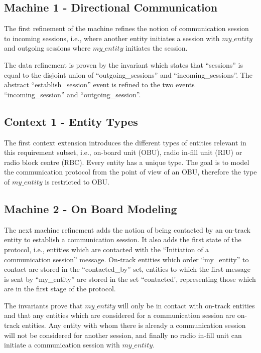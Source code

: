 \documentclass[10pt,a4paper]{article}
\begin{document}
\subsection{Machine 1 - Directional Communication}
\label{sec:mach-1-direct}

The first refinement of the machine refines the notion of communication session
to incoming sessions, i.e., where another entity initiates a session with
$my\_entity$ and outgoing sessions where $my\_entity$ initiates the session.

The data refinement is proven by the invariant which states that ``sessions'' is
equal to the disjoint union of ``outgoing\_sessions'' and
``incoming\_sessions''. The abstract ``establish\_session'' event is refined to
the two events ``incoming\_session'' and ``outgoing\_session''.



\subsection{Context 1 - Entity Types}
\label{sec:context-1-entity}

The first context extension introduces the different types of entities relevant
in this requirement subset, i.e., on-board unit (OBU), radio in-fill unit (RIU)
or radio block centre (RBC). Every entity has a unique type. The goal is to
model the communication protocol from the point of view of an OBU, therefore the
type of $my\_entity$ is restricted to OBU.



\subsection{Machine 2 - On Board Modeling}
\label{sec:machine-2-board}

The next machine refinement adds the notion of being contacted by an on-track
entity to establish a communication session. It also adds the first state of the
protocol, i.e., entities which are contacted with the ``Initiation of a
communication session'' message. On-track entities which order ``my\_entity''
to contact are stored in the ``contacted\_by'' set, entities to which the first
message is sent by ``my\_entity'' are stored in the set ``contacted',
representing those which are in the first stage of the protocol.

The invariants prove that $my\_entity$ will only be in contact with on-track
entities and that any entities which are considered for a communication session
are on-track entities. Any entity with whom there is already a communication
session will not be considered for another session, and finally no radio in-fill
unit can initiate a communication session with $my\_entity$.
\end{document}
